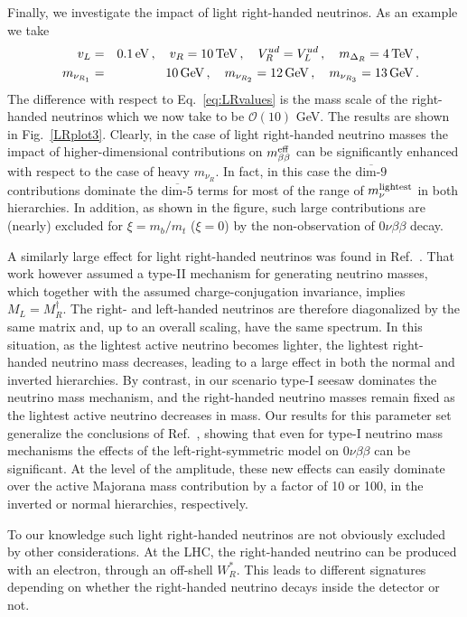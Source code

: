 \documentclass[letterpaper,11pt]{article}
\newcommand{\bt}{\beta}
\newcommand{\Dt}{\Delta}
\newcommand{\bea}{\begin{eqnarray}}
\newcommand{\eea}{\end{eqnarray}}
\newcommand{\Or}{\mathcal O}
\newcommand{\nn}{\nonumber}
\newcommand{\textoverline}[1]{$\overline{\mbox{#1}}$}
\begin{document}
Finally, we investigate the impact of light right-handed neutrinos. As an example we take
\bea\label{eq:LRvalues3}
\quad v_L&=&0.1 \, {\rm eV}\,, \quad v_R=10\, {\rm TeV}\,,\quad V_R^{ud}=V_L^{ud}\,,\quad m_{\Dt_R} = 4\, {\rm TeV}\,,\nn\\
\quad m_{\nu_{R_1}}&=&10\,{\rm GeV}\,,\quad m_{\nu_{R_2}}=12\,{\rm GeV}\,,\quad m_{\nu_{R_3}}=13\,{\rm GeV}\,.
\eea
The difference with respect to Eq.~\eqref{eq:LRvalues} is the mass scale of the right-handed neutrinos which we now take to be $\Or(10)$ GeV. The results are shown in Fig.\ \ref{LRplot3}. Clearly, in the case of light right-handed neutrino masses the impact of higher-dimensional contributions on $m_{\bt\bt}^{\rm eff}$ can be significantly enhanced with respect to the case of heavy $m_{\nu_R}$. 
In fact, in this case the \textoverline{dim-9} contributions dominate the \textoverline{dim-5} terms for most of the range of $m_\nu^{\rm lightest}$ in both hierarchies. In addition, as shown in the figure,  such large contributions are (nearly) excluded for $\xi = m_b/m_t$ ($\xi=0$) by the non-observation of $0\nu\beta\beta$ decay.


A similarly large effect for light right-handed neutrinos was found in Ref.~\cite{Tello:2010am}. That work however assumed a type-II mechanism for generating neutrino masses, which together with the assumed 
charge-conjugation invariance, implies $M_L=M^\dagger_R$.  The right- and left-handed neutrinos are therefore diagonalized by the same matrix and, up to an overall 
scaling, have the same spectrum. In this situation, as the lightest active neutrino becomes lighter, the lightest right-handed neutrino mass decreases,  leading to a large 
effect in both the normal and inverted hierarchies. By contrast, in our scenario type-I seesaw dominates the neutrino mass mechanism, and the right-handed neutrino masses 
remain fixed as the lightest active neutrino decreases in mass. Our results for this parameter set generalize the conclusions of  Ref.~\cite{Tello:2010am}, showing that even for type-I neutrino mass mechanisms the effects of the left-right-symmetric model on $0 \nu \bt \bt$ can be significant. At the level of the amplitude, these new effects can easily dominate over the active Majorana mass contribution by a factor of 10 or 100, in the inverted or normal 
hierarchies, respectively.

To our knowledge such light right-handed neutrinos are not obviously excluded by other considerations. At the LHC, the right-handed neutrino can be produced with an electron, through an off-shell $W^*_R$. This leads to different signatures depending on whether the right-handed neutrino decays inside the detector or not.
\end{document}
